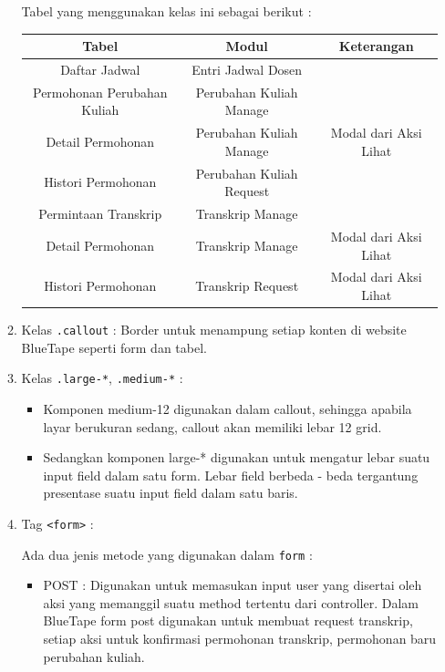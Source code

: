\documentclass[a4paper,twoside]{article}
\begin{document}
\begin{enumerate}
\begin{enumerate}
\begin{itemize}
			\end{itemize}
			Tabel yang menggunakan kelas ini sebagai berikut :
			\begin{center}
				\begin{tabular}{||c | c | c||} 
					\hline
					Tabel & Modul & Keterangan \\ [0.5ex] 
					\hline\hline
					Daftar Jadwal &  Entri Jadwal Dosen &\\
					\hline
					Permohonan Perubahan Kuliah &  Perubahan Kuliah Manage &\\
					\hline
					Detail Permohonan  &  Perubahan Kuliah Manage & Modal dari Aksi Lihat\\
					\hline
					Histori Permohonan &  Perubahan Kuliah Request & \\
					\hline
					Permintaan Transkrip &  Transkrip Manage &\\
					\hline
					Detail Permohonan &   Transkrip Manage & Modal dari Aksi Lihat\\
					\hline
					Histori Permohonan &  Transkrip Request & Modal dari Aksi Lihat\\
					\hline	
				\end{tabular}
			\end{center}	
			\item Kelas \colorbox{mygray}{\texttt{.callout}} : Border untuk menampung setiap konten di website BlueTape seperti form dan tabel. 
			\item Kelas \colorbox{mygray}{\texttt{.large-*}}, \colorbox{mygray}{\texttt{.medium-*}} :
			\begin{itemize}
				\item Komponen medium-12 digunakan dalam callout, sehingga apabila layar berukuran sedang, callout akan memiliki lebar 12 grid.
				\item Sedangkan komponen  large-* digunakan untuk mengatur lebar suatu input field dalam satu form. Lebar field berbeda - beda tergantung presentase suatu input field dalam satu baris.
			\end{itemize} 
			\item Tag \colorbox{mygray}{\texttt{<form>}} : \par
			Ada dua jenis metode yang digunakan dalam \texttt{form} :
			\begin{itemize}
				\item POST : Digunakan untuk memasukan input user yang disertai oleh aksi yang memanggil suatu method tertentu dari controller. Dalam BlueTape form post digunakan untuk membuat request transkrip, setiap aksi untuk konfirmasi permohonan transkrip, permohonan baru  perubahan kuliah.

\end{itemize}
\end{enumerate}
\end{enumerate}
\end{document}
